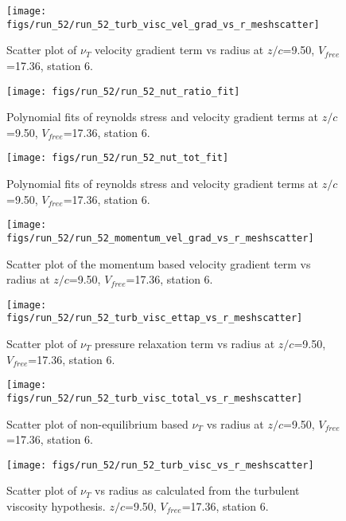 \begin{figure}[H]
\centering
\texttt{[image: figs/run\_52/run\_52\_turb\_visc\_vel\_grad\_vs\_r\_meshscatter]}
\caption{Scatter plot of $\nu_T$ velocity gradient term vs radius at $z/c$=9.50, $V_{free}$=17.36, station 6.}
\end{figure}


\begin{figure}[H]
\centering
\texttt{[image: figs/run\_52/run\_52\_nut\_ratio\_fit]}
\caption{Polynomial fits of reynolds stress and velocity gradient terms at $z/c$=9.50, $V_{free}$=17.36, station 6.}
\end{figure}


\begin{figure}[H]
\centering
\texttt{[image: figs/run\_52/run\_52\_nut\_tot\_fit]}
\caption{Polynomial fits of reynolds stress and velocity gradient terms at $z/c$=9.50, $V_{free}$=17.36, station 6.}
\end{figure}


\begin{figure}[H]
\centering
\texttt{[image: figs/run\_52/run\_52\_momentum\_vel\_grad\_vs\_r\_meshscatter]}
\caption{Scatter plot of the momentum based velocity gradient term vs radius at $z/c$=9.50, $V_{free}$=17.36, station 6.}
\end{figure}


\begin{figure}[H]
\centering
\texttt{[image: figs/run\_52/run\_52\_turb\_visc\_ettap\_vs\_r\_meshscatter]}
\caption{Scatter plot of $\nu_T$ pressure relaxation term vs radius at $z/c$=9.50, $V_{free}$=17.36, station 6.}
\end{figure}


\begin{figure}[H]
\centering
\texttt{[image: figs/run\_52/run\_52\_turb\_visc\_total\_vs\_r\_meshscatter]}
\caption{Scatter plot of non-equilibrium based $\nu_T$ vs radius at $z/c$=9.50, $V_{free}$=17.36, station 6.}
\end{figure}


\begin{figure}[H]
\centering
\texttt{[image: figs/run\_52/run\_52\_turb\_visc\_vs\_r\_meshscatter]}
\caption{Scatter plot of $\nu_T$ vs radius as calculated from the turbulent viscosity hypothesis. $z/c$=9.50, $V_{free}$=17.36, station 6.}
\end{figure}


